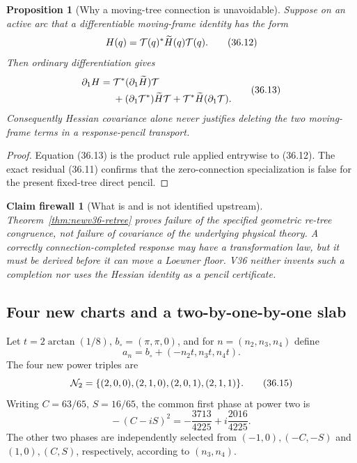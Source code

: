\documentclass[11pt,oneside]{article}
\newtheorem{proposition}[theorem]{Proposition}
\newtheorem{firewall}[theorem]{Claim firewall}
\theoremstyle{definition}
\theoremstyle{remark}
\begin{document}
\begin{proposition}[Why a moving-tree connection is unavoidable]
\label{prop:newv36-connection}
Suppose on an active arc that a differentiable moving-frame identity
has the form
\[
 H(q)={\cal T}(q)^*\widetilde H(q){\cal T}(q).          \tag{36.12}
\]
Then ordinary differentiation gives
\[
\begin{split}
 \partial_1H={}&
 {\cal T}^*(\partial_1\widetilde H){\cal T}\\
 &+(\partial_1{\cal T}^*)\widetilde H{\cal T}
   +{\cal T}^*\widetilde H(\partial_1{\cal T}).
\end{split}                                            \tag{36.13}
\]
Consequently Hessian covariance alone never justifies deleting the
two moving-frame terms in a response-pencil transport.
\end{proposition}

\begin{proof}
Equation (36.13) is the product rule applied entrywise to (36.12).
The exact residual (36.11) confirms that the zero-connection
specialization is false for the present fixed-tree direct pencil.
\end{proof}

\begin{firewall}[What is and is not identified upstream]
\label{fire:newv36-retree}
Theorem~\ref{thm:newv36-retree} proves failure of the specified
geometric re-tree congruence, not failure of covariance of the
underlying physical theory.  A correctly connection-completed
response may have a transformation law, but it must be derived
before it can move a Loewner floor.  V36 neither invents such a
completion nor uses the Hessian identity as a pencil certificate.
\end{firewall}

\subsection{Four new charts and a two-by-one-by-one slab}

Let \(t=2\arctan(1/8)\), \(b_\circ=(\pi,\pi,0)\), and for
\(n=(n_2,n_3,n_4)\) define
\[
 a_n=b_\circ+(-n_2t,n_3t,n_4t).                       \tag{36.14}
\]
The four new power triples are
\[
 {\cal N}_2=\{(2,0,0),(2,1,0),(2,0,1),(2,1,1)\}.       \tag{36.15}
\]
Writing \(C=63/65\), \(S=16/65\), the common first phase at power two
is
\[
 -\,(C-iS)^2=-\frac{3713}{4225}
                 +i\frac{2016}{4225}.                 \tag{36.16}
\]
The other two phases are independently selected from
\((-1,0),(-C,-S)\) and \((1,0),(C,S)\), respectively, according to
\((n_3,n_4)\).
\end{document}
